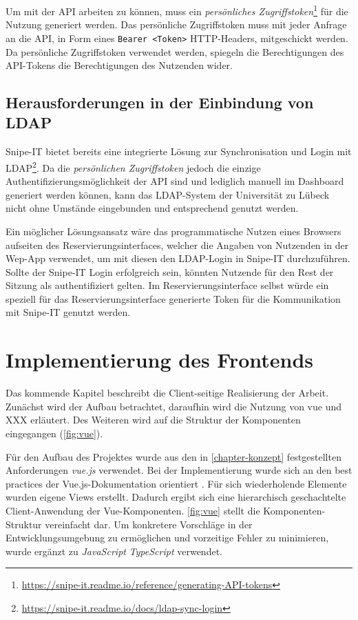 Um mit der API arbeiten zu können, muss ein \textit{persönliches
  Zugriffstoken}\footnote{\url{https://snipe-it.readme.io/reference/generating-API-tokens}} für die
Nutzung generiert werden. Das persönliche Zugriffstoken muss mit jeder Anfrage an die API, in Form
eines \lstinline{Bearer <Token>} HTTP-Headers, mitgeschickt werden. Da persönliche Zugriffstoken
verwendet werden, spiegeln die Berechtigungen des API-Tokens die Berechtigungen des Nutzenden
wider.

\subsection{Herausforderungen in der Einbindung von LDAP}
Snipe-IT bietet bereits eine integrierte Lösung zur Synchronisation und Login mit
LDAP\footnote{\url{https://snipe-it.readme.io/docs/ldap-sync-login}}. Da die \textit{persönlichen
  Zugriffstoken} jedoch die einzige Authentifizierungsmöglichkeit der API sind und lediglich manuell
im Dashboard generiert werden können, kann das LDAP-System der Universität zu Lübeck nicht ohne
Umstände eingebunden und entsprechend genutzt werden.

Ein möglicher Lösungsansatz wäre das programmatische Nutzen eines Browsers aufseiten des
Reservierungsinterfaces, welcher die Angaben von Nutzenden in der Wep-App verwendet, um mit diesen
den LDAP-Login in Snipe-IT durchzuführen. Sollte der Snipe-IT Login erfolgreich sein, könnten
Nutzende für den Rest der Sitzung als authentifiziert gelten. Im Reservierungsinterface selbst
würde ein speziell für das Reservierungsinterface generierte Token für die Kommunikation mit
Snipe-IT genutzt werden.

\section{Implementierung des Frontends}
Das kommende Kapitel beschreibt die Client-seitige Realisierung der Arbeit. Zunächst wird der Aufbau
betrachtet, daraufhin wird die Nutzung von vue und XXX erläutert. Des Weiteren wird auf die
Struktur der Komponenten eingegangen (\ref{fig:vue}).


Für den Aufbau des Projektes wurde aus den in \ref{chapter-konzept} festgestellten Anforderungen
\textit{vue.js} verwendet. Bei der Implementierung wurde sich an den best practices der
Vue.js-Dokumentation orientiert . Für sich wiederholende Elemente wurden
eigene Views erstellt. Dadurch ergibt sich eine hierarchisch geschachtelte Client-Anwendung der
Vue-Komponenten. \ref{fig:vue} stellt die Komponenten-Struktur vereinfacht dar. Um
konkretere Vorschläge in der Entwicklungsumgebung zu ermöglichen und vorzeitige Fehler zu
minimieren, wurde ergänzt zu \textit{JavaScript} \textit{TypeScript} verwendet.

